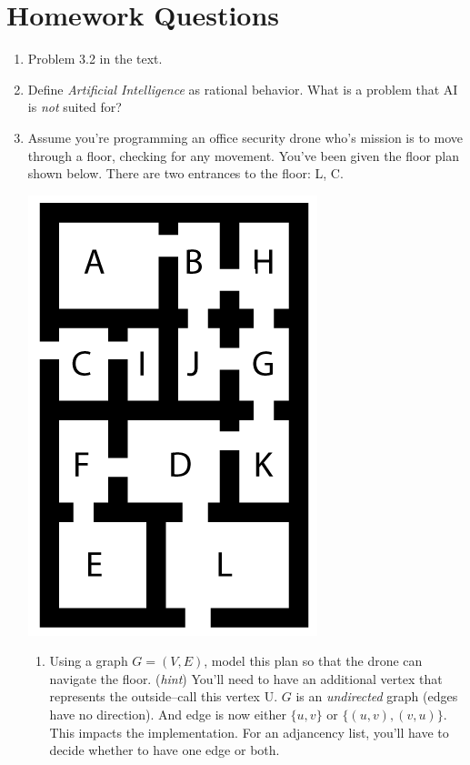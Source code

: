 \documentclass{article}
\begin{document}
\section*{Homework Questions}
\begin{enumerate}
\item Problem 3.2 in the text.
\item Define {\it Artificial Intelligence} as rational behavior.  What is a problem that AI is {\it not} suited for?
\item Assume you're programming an office security drone who's mission is to move through a floor, checking for any movement.  You've been given the floor plan shown below.  There are two entrances to the floor: \textsf{L, C}.  
\begin{center}
\includegraphics[scale=0.40]{maze55}
\end{center}
\begin{enumerate}
\item Using a graph $ G = (V,E)$, model this plan so that the drone can navigate the floor.  ({\it hint}) You'll need to have an additional vertex that represents the outside--call this vertex \textsf{U}.  $G$ is  an {\it undirected} graph (edges have no direction).  And edge is now either $\{u,v\}$ or $\{(u,v), (v,u)\}$.  This impacts the implementation.    For an adjancency list, you'll have to decide whether to have one edge or both. 

\end{enumerate}
\end{enumerate}
\end{document}
